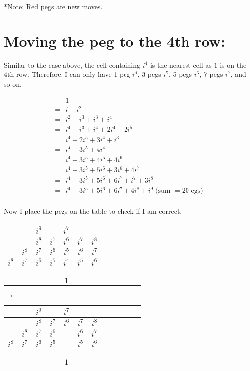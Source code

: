 \documentclass[12pt]{article}
\begin{document}
*Note: Red pegs are new moves.




\section{Moving the peg to the 4th row:}

\noindent Similar to the case above, the cell containing $i^4$ is the nearest cell as $1$ is on the 4th row. Therefore, I can only have 1 peg $i^4$, 3 pegs $i^5$, 5 pegs $i^6$, 7 pegs $i^7$, and so on.

\begin{align*}
    & 1 \\
    =& i + i^2 \\
    =& i^2+i^3 +i^3+i^4\\
    =& i^4+i^3+i^4+ 2i^4+ 2i^5\\
    =& i^4+ 2i^5+ 3i^4+ i^3\\
    =& i^4+ 3i^5+ 4i^4\\
    =& i^4+ 3i^5+ 4i^5+ 4i^6\\
    =& i^4+ 3i^5+ 5i^6+ 3i^6+ 4i^7\\    
    =& i^4+ 3i^5+ 5i^6+ 6i^7+ i^7+ 3i^8\\
    =& i^4+ 3i^5+ 5i^6+ 6i^7+ 4i^8+ i^9 \;\text{(sum $=20$ egs)}\\
\end{align*}

Now I place the pegs on the table to check if I am correct.


\begin{tabular}{|l|c|c|c|c|c|c|c|c|c|c|r|}
    \hline
    & & $i^9$ & & $i^7$ & & \\
    \hline
    & & $i^8$ & $i^7$ & $i^6$ & $i^7$ & $i^8$\\
    \hline
    & $i^8$ & $i^7$ & $i^6$ & $i^5$ & $i^6$ & $i^7$ \\
    \hline
    $i^8$ & $i^7$ & $i^6$ & $i^5$ & $i^4$ & $i^5$ & $i^6$\\
    \hline
    & & & & & & \\
    \hline
    & & & & & & \\
    \hline
    & & & & & & \\
    \hline
    & & & & $1$ & & \\
    \hline
\end{tabular}
$\longrightarrow$
\begin{tabular}{|l|c|c|c|c|c|c|c|c|c|c|r|}
    \hline
    & & $i^9$ & & $i^7$ & & \\
    \hline
    & & $i^8$ & $i^7$ & $i^6$ & $i^7$ & $i^8$\\
    \hline
    & $i^8$ & $i^7$ & $i^6$ & & $i^6$ & $i^7$ \\
    \hline
    $i^8$ & $i^7$ & $i^6$ & $i^5$ & & $i^5$ & $i^6$\\
    \hline
    & & & & \color{red}{$i^3$} & & \\
    \hline
    & & & & & & \\
    \hline
    & & & & & & \\
    \hline
    & & & & $1$ & & \\
    \hline
\end{tabular}
\end{document}
